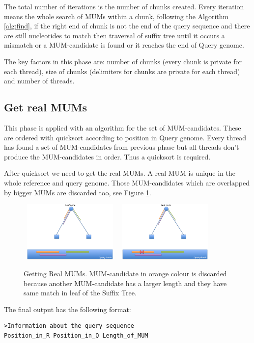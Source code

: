\documentclass[conference]{IEEEtran}
\begin{document}
The total number of iterations is the number of chunks created. Every iteration means the whole search of MUMs within a chunk, following the Algorithm \ref{alg:find}, if the right end of chunk is not the end of the query sequence and there are still nucleotides to match then traversal of suffix tree until it occurs a mismatch or a MUM-candidate is found or it reaches the end of Query genome.

The key factors in this phase are: number of chunks (every chunk is private for each thread), size of chunks (delimiters for chunks are private for each thread) and number of threads.
\subsection*{Get real MUMs}
This phase is applied with an algorithm for the set of MUM-candidates. These are ordered with quicksort according to position in Query genome. Every thread has found a set of MUM-candidates from previous phase but all threads don't produce the MUM-candidates in order. Thus a quicksort is required.

After quicksort we need to get the real MUMs. A real MUM is unique in the whole reference and query genome. Those MUM-candidates which are overlapped by bigger MUMs are discarded too, see Figure \ref{real-mums}.
\begin{figure}[htb]  
\begin{center} 
  \includegraphics[width=5cm,height=3cm]{MUMs.png}
  \includegraphics[width=5cm,height=3cm]{Remove-MUMs.png}
\end{center} 
\caption{Getting Real MUMs. MUM-candidate in orange colour is discarded because another MUM-candidate has a larger length and they have same match in leaf of the Suffix Tree.} 
\label{real-mums} 
\end{figure}
The final output has the following format:
\begin{verbatim} 
>Information about the query sequence
Position_in_R Position_in_Q Length_of_MUM
\end{verbatim}
\end{document}
